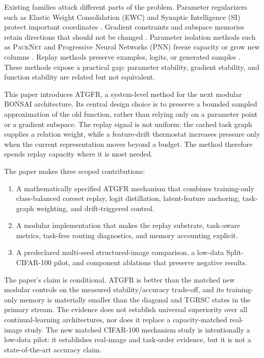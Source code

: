 \documentclass[conference]{IEEEtran}
\newcommand{\ATGFR}{\textsc{ATGFR}}
\newcommand{\TGRSC}{\textsc{TGRSC}}
\newcommand{\BONSAI}{\textsc{BONSAI}}
\newcommand{\EWC}{\textsc{EWC}}
\newcommand{\SI}{\textsc{SI}}
\newcommand{\PNN}{\textsc{PNN}}
\newcommand{\PackNet}{\textsc{PackNet}}
\begin{document}
Existing families attack different parts of the problem. Parameter
regularizers such as Elastic Weight Consolidation (\EWC) and Synaptic
Intelligence (\SI) protect important coordinates \cite{kirkpatrick2017ewc,
zenke2017si}. Gradient constraints and subspace memories retain directions
that should not be changed \cite{lopezpaz2017gem,saha2021gpm}. Parameter
isolation methods such as \PackNet{} and Progressive Neural Networks (\PNN)
freeze capacity or grow new columns \cite{mallya2018packnet,rusu2016progressive}.
Replay methods preserve examples, logits, or generated samples
\cite{rolnick2019replay,buzzega2020der,rebuffi2017icarl,shin2017generative}.
These methods expose a practical gap: parameter stability, gradient
stability, and function stability are related but not equivalent.

This paper introduces \ATGFR, a system-level method for the next modular
\BONSAI{} architecture. Its central design choice is to preserve a bounded
sampled approximation of the old function, rather than relying only on a
parameter point or a gradient subspace. The replay signal is not uniform:
the cached task graph supplies a relation weight, while a feature-drift
thermostat increases pressure only when the current representation moves
beyond a budget. The method therefore spends replay capacity where it is
most needed.

The paper makes three scoped contributions:
\begin{enumerate}
\item A mathematically specified \ATGFR{} mechanism that combines
training-only class-balanced coreset replay, logit distillation,
latent-feature anchoring, task-graph weighting, and drift-triggered control.
\item A modular implementation that makes the replay substrate, task-aware
metrics, task-free routing diagnostics, and memory accounting explicit.
\item A predeclared multi-seed structured-image comparison, a low-data
Split-CIFAR-100 pilot, and component ablations that preserve negative results.
\end{enumerate}

The paper's claim is conditional. \ATGFR{} is better than the matched new
modular controls on the measured stability/accuracy trade-off, and its
training-only memory is materially smaller than the diagonal and \TGRSC{}
states in the primary stream. The evidence does not establish universal
superiority over all continual-learning architectures, nor does it replace a
capacity-matched real-image study. The new matched CIFAR-100 mechanism
study is intentionally a low-data pilot: it establishes real-image and
task-order evidence, but it is not a state-of-the-art accuracy claim.
\end{document}

